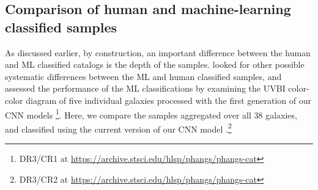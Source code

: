 \documentclass[linenumbers]{aastex63}
\begin{document}



\subsection{Comparison of human and machine-learning classified samples}\label{ssect:cc_compare}
As discussed earlier, by construction, an important difference between the human and ML classified catalogs is the depth of the samples.
\citet{whitmore_star_2021} looked for other possible systematic differences between the ML and human classified samples, and assessed the performance of the ML classifications by examining the UVBI color-color diagram of five individual galaxies processed with the first generation of our CNN models \citep{wei_deep_2020}\footnote{DR3/CR1 at \url{https://archive.stsci.edu/hlsp/phangs/phangs-cat}}.
Here, we compare the samples aggregated over all 38 galaxies, and classified using the current version of our CNN model \citep{hannon_star_2023}.\footnote{DR3/CR2 at \url{https://archive.stsci.edu/hlsp/phangs/phangs-cat}} 
\end{document}
